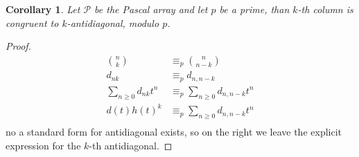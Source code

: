 \documentclass[10pt,a4paper]{article} %
\newtheorem{corollary}[theorem]{Corollary}
\begin{document}
    \begin{corollary}
    Let $\mathcal{P}$ be the Pascal array and let $p$ be a prime, than $k$-th column 
    is congruent to $k$-antidiagonal, modulo $p$.
    \end{corollary}
    \begin{proof}
        \begin{displaymath}
            \begin{split}
                { {n} \choose {k} } &\equiv_{p} { {n} \choose {n-k} } \\
                d_{nk} &\equiv_{p} d_{n,n-k}\\
                \sum_{n\geq 0}{d_{nk} t^n} &\equiv_{p}\sum_{n\geq 0}{d_{n,n-k} t^n} \\
                d(t)h(t)^k &\equiv_{p}\sum_{n\geq 0}{d_{n,n-k} t^n} \\
            \end{split}
        \end{displaymath}
    no a standard form for antidiagonal exists, so on the right we leave the explicit
    expression for the $k$-th antidiagonal.
    \end{proof}
\end{document}
